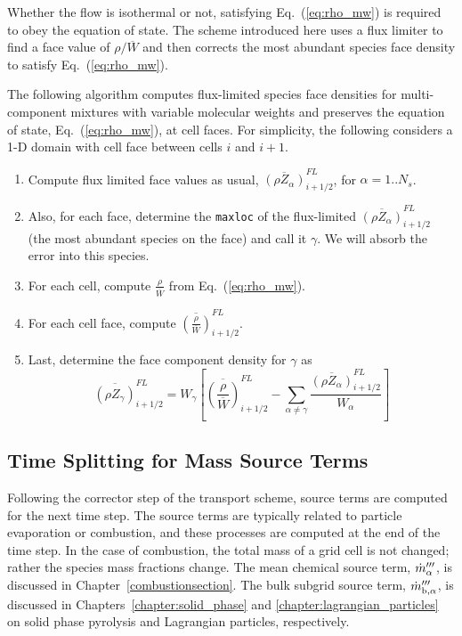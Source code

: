 Whether the flow is isothermal or not, satisfying Eq.~(\ref{eq:rho_mw}) is required to obey the equation of state.  The scheme introduced here uses a flux limiter to find a face value of $\rho/\overline{W}$ and then corrects the most abundant species face density to satisfy Eq.~(\ref{eq:rho_mw}).

The following algorithm computes flux-limited species face densities for multi-component mixtures with variable molecular weights and preserves the equation of state, Eq.~(\ref{eq:rho_mw}), at cell faces.  For simplicity, the following considers a 1-D domain with cell face between cells $i$ and $i+1$.
\begin{enumerate}
\item Compute flux limited face values as usual, $\overline{(\rho Z_\alpha)}^{FL}_{i+1/2}$, for $\alpha=1..N_s$.
\item Also, for each face, determine the {\tt maxloc} of the flux-limited $\overline{(\rho Z_\alpha)}^{FL}_{i+1/2}$ (the most abundant species on the face) and call it $\gamma$.  We will absorb the error into this species.
\item For each cell, compute $\displaystyle \frac{\rho}{\overline{W}}$ from Eq.~(\ref{eq:rho_mw}).
\item For each cell face, compute $\displaystyle \overline{\left(\frac{\rho}{\overline{W}}\right)}^{FL}_{i+1/2}$.
\item Last, determine the face component density for $\gamma$ as
\begin{equation}
\overline{(\rho Z_\gamma)}^{FL}_{i+1/2} = W_\gamma \left[\overline{\left(\frac{\rho}{\overline{W}}\right)}^{FL}_{i+1/2} - \sum_{\alpha\ne\gamma} \frac{\overline{(\rho Z_{\alpha})}^{FL}_{i+1/2}}{W_\alpha} \right]
\end{equation}
\end{enumerate}


\subsection{Time Splitting for Mass Source Terms}
\label{sec_time_splitting}

Following the corrector step of the transport scheme, source terms are computed for the next time step.  The source terms are typically related to particle evaporation or combustion, and these processes are computed at the end of the time step. In the case of combustion, the total mass of a grid cell is not changed; rather the species mass fractions change. The mean chemical source term, $\dot{m}_{\alpha}'''$, is discussed in Chapter~\ref{combustionsection}.  The bulk subgrid source term, $\dot{m}_{\rm b,\alpha}'''$, is discussed in Chapters~\ref{chapter:solid_phase} and \ref{chapter:lagrangian_particles} on solid phase pyrolysis and Lagrangian particles, respectively.


